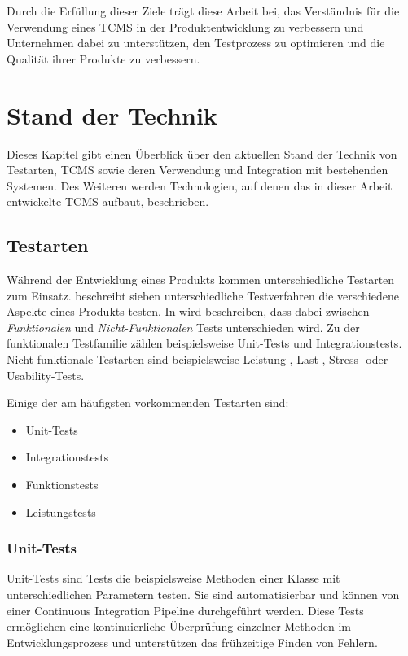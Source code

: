 \documentclass[a4paper, fontsize=11pt, parskip=half, twoside, headings=openright]{scrreprt}
\begin{document}
	Durch die Erfüllung dieser Ziele trägt diese Arbeit bei, das Verständnis für die Verwendung eines \ac{TCMS} in der Produktentwicklung zu verbessern und Unternehmen dabei zu unterstützen, den Testprozess zu optimieren und die Qualität ihrer Produkte zu verbessern.
	
	
	
	\chapter{Stand der Technik}
	Dieses Kapitel gibt einen Überblick über den aktuellen Stand der Technik von Testarten, \ac{TCMS} sowie deren Verwendung und Integration mit bestehenden Systemen. 
	Des Weiteren werden Technologien, auf denen das in dieser Arbeit entwickelte \ac{TCMS} aufbaut, beschrieben.
	
	\section{Testarten} \label{sec:testtypes}
	Während der Entwicklung eines Produkts kommen unterschiedliche Testarten zum Einsatz. 
	\textcite{atlassian_unterschiedlichen_nodate} beschreibt sieben unterschiedliche Testverfahren die verschiedene Aspekte eines Produkts testen.
	In \textcite{noauthor_software_nodate} wird beschreiben, dass dabei zwischen \emph{Funktionalen} und \emph{Nicht-Funktionalen} Tests unterschieden wird.
	Zu der funktionalen Testfamilie zählen beispielsweise Unit-Tests und Integrationstests.
	Nicht funktionale Testarten sind beispielsweise Leistung-, Last-, Stress- oder Usability-Tests.
	
	Einige der am häufigsten vorkommenden Testarten sind:
	
	\begin{itemize}
		\item Unit-Tests
		\item Integrationstests
		\item Funktionstests
		\item Leistungstests
	\end{itemize}
	
	\subsection{Unit-Tests}
	Unit-Tests sind Tests die beispielsweise Methoden einer Klasse mit unterschiedlichen Parametern testen. 
	Sie sind automatisierbar und können von einer Continuous Integration Pipeline durchgeführt werden. 
	Diese Tests ermöglichen eine kontinuierliche Überprüfung einzelner Methoden im Entwicklungsprozess und unterstützen das frühzeitige Finden von Fehlern.
	
\end{document}
